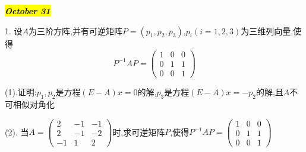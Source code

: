 \hl{\textbf{\textit{October 31}}}

1. 设$A$为三阶方阵,并有可逆矩阵$P=(p_{1},p_{2},p_{3})$,$p_{i}(i=1,2,3)$为三维列向量,使得
$$P^{-1}AP=\begin{pmatrix}
	1&0&0\\0&1&1\\0&0&1
\end{pmatrix}$$

(1).证明:$p_{1},p_{2}$是方程$(E-A)x=0$的解,$p_{3}$是方程$(E-A)x=-p_{2}$的解,且$A$不可相似对角化

(2). 当$A=\begin{pmatrix}
	2&-1&-1\\2&-1&-2\\-1&1&2
\end{pmatrix}$时,求可逆矩阵$P$,使得$P^{-1}AP=\begin{pmatrix}
1&0&0\\0&1&1\\0&0&1
\end{pmatrix}$
\begin{solution}
	
\end{solution}
